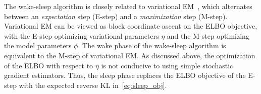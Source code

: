 The wake-sleep algorithm is closely related to variational EM~\citep{Jordan_intro_vi, neal2000varem, Beal2002varem}, 
which alternates between an {\itshape expectation} step (E-step) and a {\itshape maximization} step (M-step). 
Variational EM can be viewed as block coordinate ascent on the ELBO objective, with the E-step optimizing variational parameters $\eta$ and the M-step optimizing the model parameters $\phi$. 
The wake phase of the wake-sleep algorithm is equivalent to the M-step of variational EM. 
As discussed above, the optimization of the ELBO with respect to $\eta$ is not conducive to using simple stochastic gradient estimators.
Thus, the sleep phase replaces the ELBO objective of the E-step with the expected reverse KL in~\eqref{eq:sleep_obj}.




